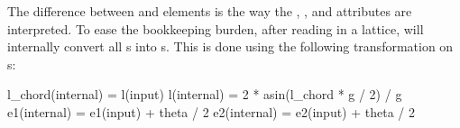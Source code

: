 The difference between  and  elements
is the way the , , and  attributes are interpreted.
To ease the bookkeeping burden, after reading in a lattice, \bmad will
internally convert all s into s. 
This is done using the following transformation on s:
\begin{example}
  l_chord(internal) = l(input)
  l(internal) = 2 * asin(l_chord * g / 2) / g
  e1(internal) = e1(input) + theta / 2
  e2(internal) = e2(input) + theta / 2
\end{example}

\begin{figure}[tb]
  \centering
  \hspace{1cm}

\end{figure}
